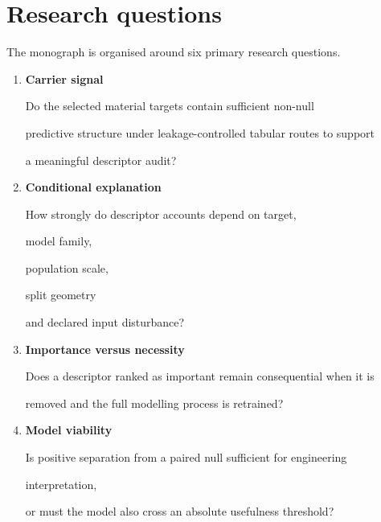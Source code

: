 \documentclass[11pt,a4paper,oneside]{report}
\begin{document}
\section{Research questions}



The monograph is organised around six primary research questions.



\begin{enumerate}



\item

\textbf{Carrier signal}



Do the selected material targets contain sufficient non-null

predictive structure under leakage-controlled tabular routes to support

a meaningful descriptor audit?



\item

\textbf{Conditional explanation}



How strongly do descriptor accounts depend on target,

model family,

population scale,

split geometry

and declared input disturbance?



\item

\textbf{Importance versus necessity}



Does a descriptor ranked as important remain consequential when it is

removed and the full modelling process is retrained?



\item

\textbf{Model viability}



Is positive separation from a paired null sufficient for engineering

interpretation,

or must the model also cross an absolute usefulness threshold?




\end{enumerate}
\end{document}
